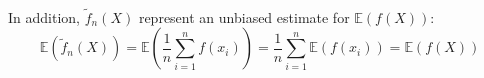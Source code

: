 \\In addition, $\widetilde{f}_{n}(X)$ represent an unbiased estimate for $\mathbb{E}(f(X))$:
\begin{equation}
\mathbb{E}(\widetilde{f}_{n}(X)) = \mathbb{E} \left ( \frac{1}{n} \sum_{i=1}^{n} f(x_{i})   \right ) =
\frac{1}{n} \sum_{i=1}^{n} \mathbb{E}(f(x_{i})) =   \mathbb{E}(f(X))
\end{equation}
